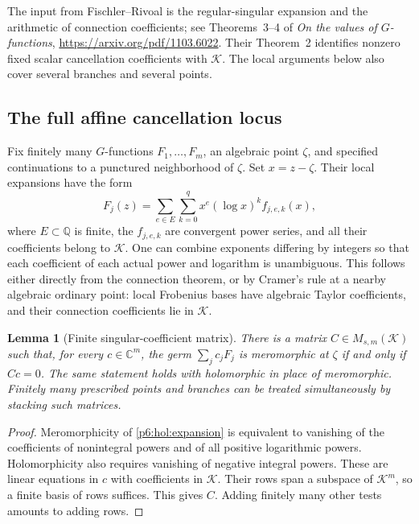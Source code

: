 \documentclass[11pt,a4paper]{article}
\newtheorem{lemma}[theorem]{Lemma}
\theoremstyle{definition}
\theoremstyle{remark}
\numberwithin{equation}{section}
\begin{document}
The input from Fischler--Rivoal is the regular-singular expansion and
the arithmetic of connection coefficients; see Theorems~3--4 of
\emph{On the values of $G$-functions},
\url{https://arxiv.org/pdf/1103.6022}.
Their Theorem~2 identifies nonzero fixed scalar cancellation
coefficients with $\mathcal K$.  The local arguments below also
cover several branches and several points.

\subsection{The full affine cancellation locus}

Fix finitely many $G$-functions $F_1,\ldots,F_m$, an algebraic point
$\zeta$, and specified continuations to a punctured neighborhood of
$\zeta$.  Set $x=z-\zeta$.  Their local expansions have the form
\begin{equation}\label{p6:hol:expansion}
 F_j(z)=\sum_{e\in E}\sum_{k=0}^{q}
       x^e(\log x)^k f_{j,e,k}(x),
\end{equation}
where $E\subset\mathbb Q$ is finite, the $f_{j,e,k}$ are convergent
power series, and all their coefficients belong to $\mathcal K$.
One can combine exponents differing by integers so that each
coefficient of each actual power and logarithm is unambiguous.
This follows either directly from the connection theorem, or by
Cramer's rule at a nearby algebraic ordinary point: local Frobenius
bases have algebraic Taylor coefficients, and their connection
coefficients lie in $\mathcal K$.

\begin{lemma}[Finite singular-coefficient matrix]\label{p6:hol:matrix}
There is a matrix $C\in M_{s,m}(\mathcal K)$ such that, for every
$c\in\mathbb C^m$, the germ $\sum_jc_jF_j$ is meromorphic at
$\zeta$ if and only if $Cc=0$.  The same statement holds with
holomorphic in place of meromorphic.  Finitely many prescribed
points and branches can be treated simultaneously by stacking
such matrices.
\end{lemma}
\begin{proof}
Meromorphicity of \eqref{p6:hol:expansion} is equivalent to vanishing
of the coefficients of nonintegral powers and of all positive
logarithmic powers.  Holomorphicity also requires vanishing of
negative integral powers.  These are linear equations in $c$
with coefficients in $\mathcal K$.  Their rows span a subspace
of $\mathcal K^m$, so a finite basis of rows suffices.  This gives
$C$.  Adding finitely many other tests amounts to adding rows.
\end{proof}
\end{document}
